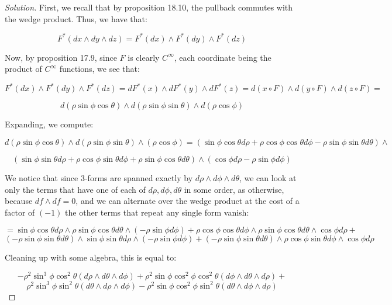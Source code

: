 \documentclass[10pt]{article}
\theoremstyle{nonumberplain}%
\begin{document}
\begin{proof}[Solution]

First, we recall that by proposition 18.10, the pullback commutes with the wedge product. Thus, we have that:

$$  F^*(dx \wedge dy \wedge dz) =  F^*(dx) \wedge F^*(dy) \wedge F^*(dz)$$

Now, by proposition 17.9, since $F$ is clearly $C^\infty$, each coordinate being the product of $C^\infty$ functions, we see that:

$$   F^*(dx) \wedge F^*(dy) \wedge F^*(dz) =   dF^*(x) \wedge dF^*(y) \wedge dF^*(z)= d(x \circ F) \wedge d(y \circ F) \wedge d (z \circ F) = $$

$$ d(\rho \sin \phi \cos \theta) \wedge  d(\rho \sin \phi \sin \theta) \wedge d(\rho \cos \phi) $$

Expanding, we compute:

$$  d(\rho \sin \phi \cos \theta) \wedge  d(\rho \sin \phi \sin \theta) \wedge (\rho \cos \phi) = (\sin \phi \cos\theta d\rho + \rho \cos \phi \cos \theta d\phi - \rho \sin \phi \sin \theta d\theta) \wedge $$

$$ ( \sin \phi \sin \theta d\rho + \rho \cos\phi \sin \theta d\phi + \rho \sin \phi \cos \theta d\theta) \wedge (\cos \phi d\rho - \rho \sin \phi d\phi) $$

We notice that since $3$-forms are spanned exactly by $d\rho \wedge d\phi \wedge d\theta$, we can look at only the terms that have one of each of $d\rho, d\phi, d\theta$ in some order, as otherwise, because $df \wedge df = 0$, and we can alternate over the wedge product at the cost of a factor of $(-1)$ the other terms that repeat any single form vanish:

$$ =  \sin \phi \cos\theta d\rho \wedge  \rho \sin \phi \cos \theta d\theta \wedge ( - \rho \sin \phi d\phi) +  \rho \cos \phi \cos \theta d\phi \wedge \rho \sin \phi \cos \theta d\theta \wedge \cos \phi d\rho+ $$
$$( - \rho \sin \phi \sin \theta d\theta) \wedge  \sin \phi \sin \theta d\rho  \wedge ( - \rho \sin \phi d\phi) +  (- \rho \sin \phi \sin \theta d\theta) \wedge \rho \cos\phi \sin \theta d\phi \wedge  \cos \phi d\rho $$

Cleaning up with some algebra, this is equal to:

$$ - \rho^2 \sin^3 \phi \cos^2 \theta (d\rho \wedge d\theta \wedge d\phi) + \rho^2 \sin \phi \cos^2 \phi \cos^2 \theta (d\phi \wedge d\theta \wedge d\rho) +$$
$$ \rho^2 \sin^3 \phi \sin^2 \theta (d\theta \wedge d\rho \wedge d\phi) - \rho^2 \sin \phi \cos^2 \phi \sin^2 \theta (d\theta \wedge d\phi \wedge d\rho) $$


\end{proof}
\end{document}
